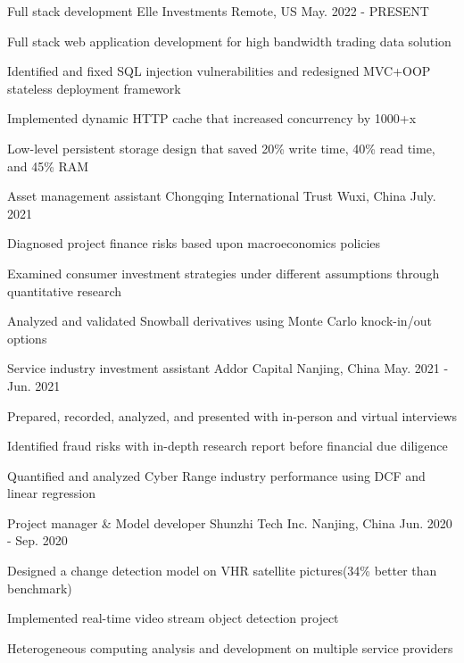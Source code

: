 \begin{cventries}
  \cventry
    {Full stack development}
    {Elle Investments}
    {Remote, US}
    {May. 2022 - PRESENT}
    {
      \begin{cvitems}
        \item {Full stack web application development for high bandwidth trading data solution}
        \item {Identified and fixed SQL injection vulnerabilities and redesigned MVC+OOP stateless deployment framework}
        \item {Implemented dynamic HTTP cache that increased concurrency by 1000+x}
        \item {Low-level persistent storage design that saved 20\% write time, 40\% read time, and 45\% RAM}
      \end{cvitems}
    }

  \cventry
    {Asset management assistant}
    {Chongqing International Trust}
    {Wuxi, China}
    {July. 2021}
    {
      \begin{cvitems}
        \item {Diagnosed project finance risks based upon macroeconomics policies}
        \item {Examined consumer investment strategies under different assumptions through quantitative research}
        \item {Analyzed and validated Snowball derivatives using Monte Carlo knock-in/out options}
      \end{cvitems}
    }

  \cventry
    {Service industry investment assistant}
    {Addor Capital}
    {Nanjing, China}
    {May. 2021 - Jun. 2021}
    {
      \begin{cvitems}
        \item {Prepared, recorded, analyzed, and presented with in-person and virtual interviews }
        \item {Identified fraud risks with in-depth research report before financial due diligence}
        \item {Quantified and analyzed Cyber Range industry performance using DCF and linear regression}
      \end{cvitems}
    }

  \cventry
    {Project manager \& Model developer}
    {Shunzhi Tech Inc.}
    {Nanjing, China}
    {Jun. 2020 - Sep. 2020}
    {
      \begin{cvitems}
        \item {Designed a change detection model on VHR satellite pictures(34\% better than benchmark)}
        \item {Implemented real-time video stream object detection project}
        \item {Heterogeneous computing analysis and development on multiple service providers}
      \end{cvitems}
    }


\end{cventries}
